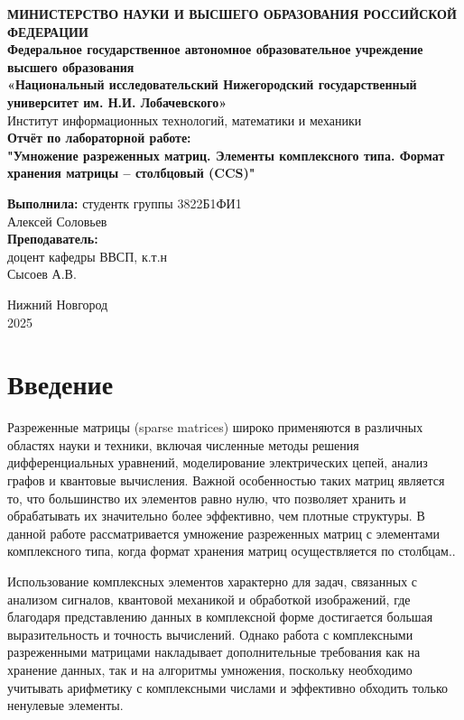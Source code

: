\documentclass[12pt]{article}
\begin{document}
\begin{titlepage}
\begin{center}
\textbf{МИНИСТЕРСТВО НАУКИ И ВЫСШЕГО ОБРАЗОВАНИЯ РОССИЙСКОЙ ФЕДЕРАЦИИ} \\
\textbf{Федеральное государственное автономное образовательное учреждение высшего образования \\ «Национальный исследовательский Нижегородский государственный университет им. Н.И. Лобачевского»} \\
Институт информационных технологий, математики и механики \\
\vspace{3cm}
{\Large
\textbf{Отчёт по лабораторной работе:} \\[0.5cm]
\textbf{"Умножение разреженных матриц. Элементы комплексного типа. Формат хранения матрицы – столбцовый (CCS)"} \\
}
\vspace{2cm}
\begin{flushright}
\textbf{Выполнила:} студентк группы 3822Б1ФИ1\\
Алексей Соловьев \\
\vspace{0.5cm}
\textbf{Преподаватель:} \\
доцент кафедры ВВСП, к.т.н \\ Сысоев А.В.
\end{flushright}
\vspace{2.5cm}
Нижний Новгород \\
2025
\end{center}
\end{titlepage}

\newpage
\section{Введение}

Разреженные матрицы (sparse matrices) широко применяются в различных областях науки и техники, включая численные методы решения дифференциальных уравнений, моделирование электрических цепей, анализ графов и квантовые вычисления. Важной особенностью таких матриц является то, что большинство их элементов равно нулю, что позволяет хранить и обрабатывать их значительно более эффективно, чем плотные структуры. В данной работе рассматривается умножение разреженных матриц с элементами комплексного типа, когда формат хранения матриц осуществляется по столбцам..

Использование комплексных элементов характерно для задач, связанных с анализом сигналов, квантовой механикой и обработкой изображений, где благодаря представлению данных в комплексной форме достигается большая выразительность и точность вычислений. Однако работа с комплексными разреженными матрицами накладывает дополнительные требования как на хранение данных, так и на алгоритмы умножения, поскольку необходимо учитывать арифметику с комплексными числами и эффективно обходить только ненулевые элементы.
\end{document}
